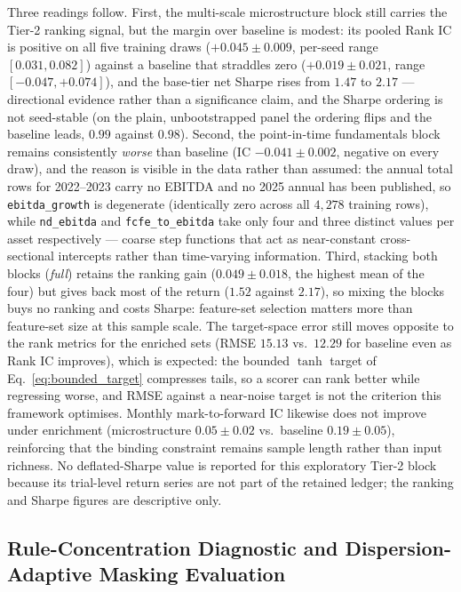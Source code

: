 \documentclass[pdflatex,sn-mathphys-num]{sn-jnl}
\theoremstyle{thmstyleone}
\theoremstyle{thmstyletwo}
\theoremstyle{thmstylethree}
\begin{document}
Three readings follow. First, the multi-scale microstructure block still carries the Tier-2 ranking signal, but the margin over baseline is modest: its pooled Rank IC is positive on all five training draws ($+0.045 \pm 0.009$, per-seed range $[0.031, 0.082]$) against a baseline that straddles zero ($+0.019 \pm 0.021$, range $[-0.047, +0.074]$), and the base-tier net Sharpe rises from $1.47$ to $2.17$ --- directional evidence rather than a significance claim, and the Sharpe ordering is not seed-stable (on the plain, unbootstrapped panel the ordering flips and the baseline leads, $0.99$ against $0.98$). Second, the point-in-time fundamentals block remains consistently \emph{worse} than baseline (IC $-0.041 \pm 0.002$, negative on every draw), and the reason is visible in the data rather than assumed: the annual total rows for 2022--2023 carry no EBITDA and no 2025 annual has been published, so \texttt{ebitda\_growth} is degenerate (identically zero across all $4{,}278$ training rows), while \texttt{nd\_ebitda} and \texttt{fcfe\_to\_ebitda} take only four and three distinct values per asset respectively --- coarse step functions that act as near-constant cross-sectional intercepts rather than time-varying information. Third, stacking both blocks (\emph{full}) retains the ranking gain ($0.049 \pm 0.018$, the highest mean of the four) but gives back most of the return ($1.52$ against $2.17$), so mixing the blocks buys no ranking and costs Sharpe: feature-set selection matters more than feature-set size at this sample scale. The target-space error still moves opposite to the rank metrics for the enriched sets (RMSE $15.13$ vs.\ $12.29$ for baseline even as Rank IC improves), which is expected: the bounded $\tanh$ target of Eq.~\eqref{eq:bounded_target} compresses tails, so a scorer can rank better while regressing worse, and RMSE against a near-noise target is not the criterion this framework optimises. Monthly mark-to-forward IC likewise does not improve under enrichment (microstructure $0.05 \pm 0.02$ vs.\ baseline $0.19 \pm 0.05$), reinforcing that the binding constraint remains sample length rather than input richness. No deflated-Sharpe value is reported for this exploratory Tier-2 block because its trial-level return series are not part of the retained ledger; the ranking and Sharpe figures are descriptive only.

\fi
\subsection{Rule-Concentration Diagnostic and Dispersion-Adaptive Masking Evaluation}\label{subsec4_4}
\end{document}
